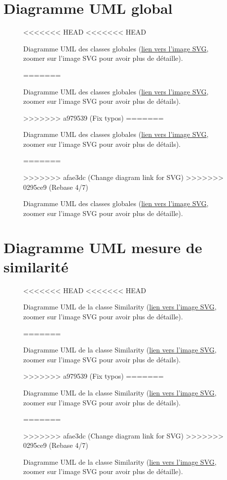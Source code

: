 \begin{appendices}
\section*{Diagramme UML global}\label{app:UMLGlobal}
\begin{figure}[!htbp]
	\center
<<<<<<< HEAD
<<<<<<< HEAD
	\caption{Diagramme UML des classes globales (\href{https://raw.githubusercontent.com/gabriel-combe/Cuttlefish_Tracker/main/rapport/UML/classes.svg}{lien vers l'image SVG}, zoomer sur l'image SVG pour avoir plus de détaille).}
=======
	\caption{Diagramme UML des classes globales (\href{https://raw.githubusercontent.com/gabriel-combe/Cuttlefish_Tracker/main/rapport/UML/classes.svg}{lien vers l'image SVG}, zoomer sur l'image SVG pour avoir plus de détails).}
>>>>>>> a979539 (Fix typos)
=======
	\caption{Diagramme UML des classes globales (\href{https://raw.githubusercontent.com/gabriel-combe/Cuttlefish_Tracker/main/rapport/UML/classes.svg}{lien vers l'image SVG}, zoomer sur l'image SVG pour avoir plus de détails).}
=======
	\caption{Diagramme UML des classes globales (\href{https://raw.githubusercontent.com/gabriel-combe/Cuttlefish_Tracker/test/rapport/UML/classes.svg}{lien vers l'image SVG}, zoomer sur l'image SVG pour avoir plus de détaille).}
>>>>>>> afae3dc (Change diagram link for SVG)
>>>>>>> 0295ce9 (Rebase 4/7)
	\label{fig:uml_diagram_classes}
\end{figure}
\FloatBarrier
	

\clearpage
\section*{Diagramme UML mesure de similarité}\label{app:UMLSimilarity}
\begin{figure}[!htbp]
	\center
<<<<<<< HEAD
<<<<<<< HEAD
	\caption{Diagramme UML de la classe Similarity (\href{https://raw.githubusercontent.com/gabriel-combe/Cuttlefish_Tracker/main/rapport/UML/similarity.svg}{lien vers l'image SVG}, zoomer sur l'image SVG pour avoir plus de détaille).}
=======
	\caption{Diagramme UML de la classe Similarity (\href{https://raw.githubusercontent.com/gabriel-combe/Cuttlefish_Tracker/main/rapport/UML/similarity.svg}{lien vers l'image SVG}, zoomer sur l'image SVG pour avoir plus de détails).}
>>>>>>> a979539 (Fix typos)
=======
	\caption{Diagramme UML de la classe Similarity (\href{https://raw.githubusercontent.com/gabriel-combe/Cuttlefish_Tracker/main/rapport/UML/similarity.svg}{lien vers l'image SVG}, zoomer sur l'image SVG pour avoir plus de détails).}
=======
	\caption{Diagramme UML de la classe Similarity (\href{https://raw.githubusercontent.com/gabriel-combe/Cuttlefish_Tracker/test/rapport/UML/similarity.svg}{lien vers l'image SVG}, zoomer sur l'image SVG pour avoir plus de détaille).}
>>>>>>> afae3dc (Change diagram link for SVG)
>>>>>>> 0295ce9 (Rebase 4/7)
	\label{fig:uml_diagram_similarity}
\end{figure}
\FloatBarrier



\end{appendices}
